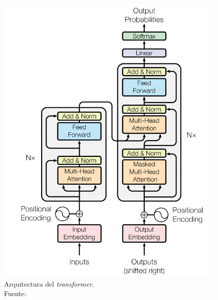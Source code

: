 \documentclass[a4paper]{article}
\begin{document}
\vspace{2mm}

\begin{figure}
\includegraphics[width=0.95\linewidth]{imagenes/transformer-arquitectura.png} 
\caption{Arquitectura del \textit{transformer}.\\Fuente: \cite{NIPS2017_3f5ee243}}
\label{fig:arquitectura-transformer}
\end{figure}
\end{document}

